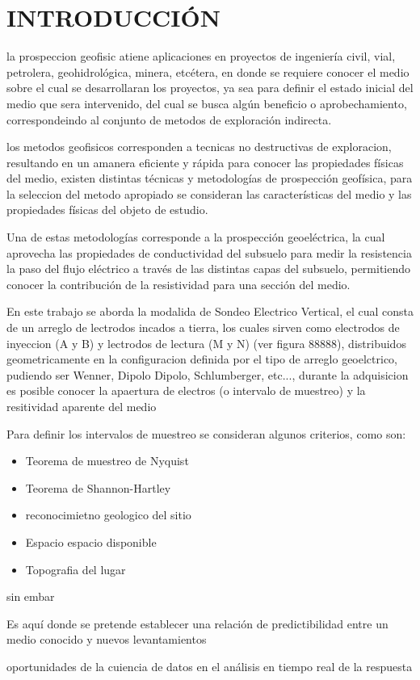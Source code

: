 \chapter{INTRODUCCIÓN}
la prospeccion geofisic atiene aplicaciones en proyectos de ingeniería civil, vial, petrolera, geohidrológica, minera, etcétera, en donde se requiere conocer el medio sobre el cual se desarrollaran los proyectos, ya sea para definir el estado inicial del medio que sera intervenido, del cual se busca algún beneficio o aprobechamiento, correspondeindo al conjunto de metodos  de exploración indirecta.

los metodos geofisicos corresponden a tecnicas no destructivas de exploracion, resultando en un amanera eficiente y rápida para conocer las propiedades físicas del medio, existen distintas técnicas y metodologías de prospección geofísica,  para la seleccion del metodo apropiado se consideran las características del medio y las propiedades físicas del objeto de estudio.

Una de estas metodologías corresponde a la prospección geoeléctrica, la cual aprovecha las propiedades de conductividad del subsuelo para medir la resistencia la paso del flujo eléctrico a través de las distintas capas del subsuelo, permitiendo conocer la contribución de la resistividad para una sección del medio.

En este trabajo se aborda la modalida de Sondeo Electrico Vertical, el cual consta de un arreglo de lectrodos incados a tierra, los cuales sirven como electrodos de inyeccion (A y B) y lectrodos de lectura (M y N) (ver figura 88888), distribuidos geometricamente en la configuracion definida por el tipo de arreglo geoelctrico, pudiendo ser Wenner, Dipolo Dipolo, Schlumberger, etc..., durante la adquisicion es posible conocer la apaertura de electros (o intervalo de muestreo) y la resitividad aparente del medio 

Para definir los intervalos de muestreo se consideran algunos criterios, como son: 

\begin{itemize}
	\item Teorema de muestreo de Nyquist
	\item Teorema de Shannon-Hartley
	\item reconocimietno geologico del sitio 
	\item Espacio espacio disponible
	\item Topografia del lugar
\end{itemize}

sin embar



Es aquí donde se pretende establecer una relación de predictibilidad entre un medio conocido y nuevos levantamientos
 


oportunidades de la cuiencia de datos en el análisis en tiempo real de la respuesta 



